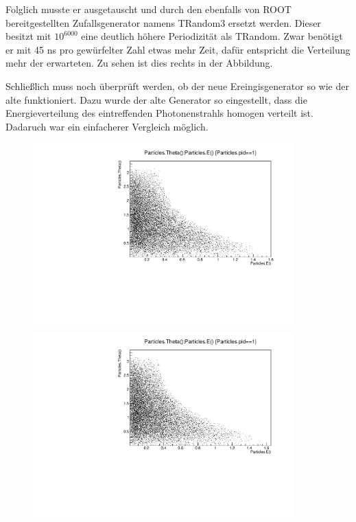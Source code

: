 \documentclass[a4paper,11pt,oneside,final,german,openbib,pdftex]{scrbook}
\begin{document}
{Folglich musste er ausgetauscht und durch den ebenfalls von ROOT bereitgestellten Zufallsgenerator namens TRandom3 ersetzt werden. Dieser besitzt mit $10^{6000}$ eine deutlich höhere Periodizität als TRandom. Zwar ben\"otigt er mit 45 ns pro gew\"urfelter Zahl etwas mehr Zeit, daf\"ur entspricht die Verteilung mehr der erwarteten. Zu sehen ist dies rechts in der Abbildung.

Schlie{\ss}lich muss noch überprüft werden, ob der neue Ereingisgenerator so wie der alte funktioniert. Dazu wurde der alte Generator so eingestellt, dass die Energieverteilung des eintreffenden Photonenstrahls homogen verteilt ist. Dadaruch war ein einfacherer Vergleich m\"oglich. 

\begin{figure}[h!]
	\centering
	\begin{minipage}{0.45\textwidth}
		\centering
		\includegraphics[width=0.9\textwidth]{20170704Pi0_Gun_New}
	\end{minipage}
	\hfill
	\begin{minipage}{0.45\textwidth}
		\centering
		\includegraphics[width=0.9\textwidth]{20170704Pi0_Gun_Old}
	\end{minipage}
	

\end{figure}}
\end{document}
